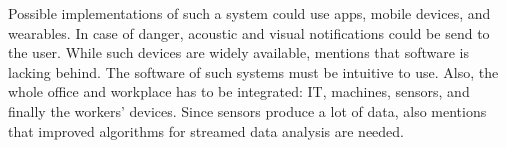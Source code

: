 Possible implementations of such a system could use apps, mobile devices, and wearables. In case of 
danger, acoustic and visual notifications could be send to the user. While such devices are widely 
available, \cite{sda-wired} mentions that software is lacking behind. The software of such systems 
must be intuitive to use. Also, the whole office and workplace has to be integrated: IT, machines, 
sensors, and finally the workers' devices. Since sensors produce a lot of data, \cite{sda-wired} 
also mentions that improved algorithms for streamed data analysis are needed.




